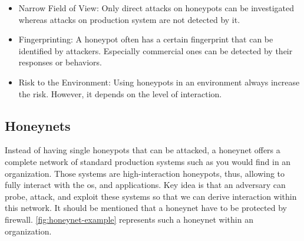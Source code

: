 \begin{itemize}
    \item Narrow Field of View: Only direct attacks on honeypots can be investigated whereas attacks on production system are not detected by it.
    \item Fingerprinting: A honeypot often has a certain fingerprint that can be identified by attackers.
          Especially commercial ones can be detected by their responses or behaviors.
    \item Risk to the Environment: Using honeypots in an environment always increase the risk.
          However, it depends on the level of interaction.
\end{itemize}

\subsection{Honeynets}

Instead of having single honeypots that can be attacked, a honeynet offers a complete network of standard production systems such as you would find in an organization.
Those systems are high-interaction honeypots, thus, allowing to fully interact with the \ac{os}, and applications.
Key idea is that an adversary can probe, attack, and exploit these systems so that we can derive interaction within this network.
It should be mentioned that a honeynet have to be protected by firewall. \autoref{fig:honeynet-example} represents such a honeynet within an organization.

